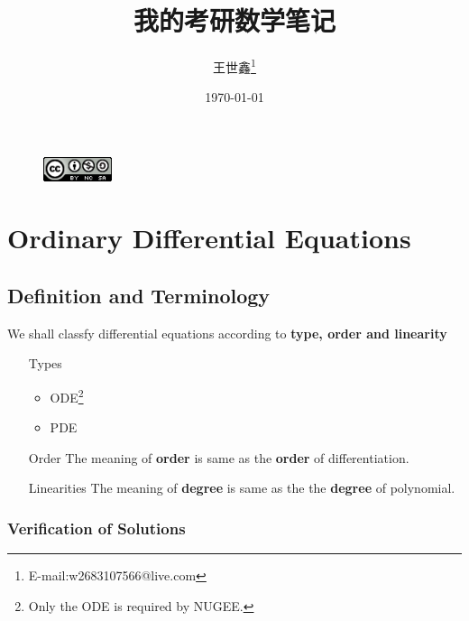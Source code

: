 \documentclass{beaulivre}
\title{我的考研数学笔记}
\author{王世鑫\thanks{E-mail:w2683107566@live.com}}
\date{\today}
\begin{document}

\begin{figure}[h]
    \centering
    \includegraphics[width=2cm]{cc-icon.png} 
\end{figure}


\tableofcontents

\mainmatter
\twocolumn


\cleardoublepage


\cleardoublepage


\cleardoublepage


\cleardoublepage
\chapter{Ordinary Differential Equations}
\section{Definition and Terminology} \label{def-de}
We shall classfy differential equations according to 
\textbf{type, order and linearity}

\begin{itemize}
    \item[Types]
        \begin{itemize}
            \item ODE\footnote{Only the ODE is required by NUGEE.}
            \item PDE
        \end{itemize}
    \item[Order]
        The meaning of \textbf{order} is same as the 
        \textbf{order} of differentiation.
    \item[Linearities]
        The meaning of \textbf{degree} is same as the 
        the \textbf{degree} of polynomial.
\end{itemize}

\subsection{Verification of Solutions}
\end{document}
